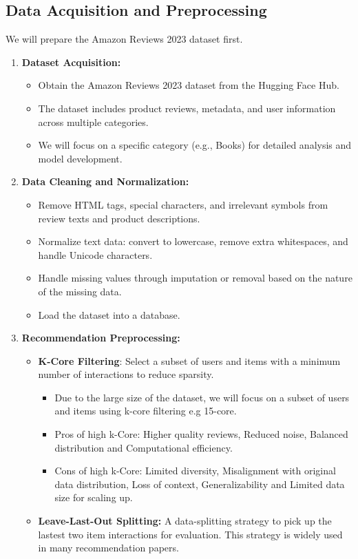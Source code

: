 \documentclass{article}
\begin{document}
\subsection{Data Acquisition and Preprocessing} 
We will prepare the Amazon Reviews 2023 dataset first.
\begin{enumerate}
    \item \textbf{Dataset Acquisition:} 
    \begin{itemize}
        \item Obtain the Amazon Reviews 2023 dataset from the Hugging Face Hub.
        \item The dataset includes product reviews, metadata, and user information across multiple categories.
        \item We will focus on a specific category (e.g., Books) for detailed analysis and model development.
    \end{itemize}
    
    \item \textbf{Data Cleaning and Normalization:}
    \begin{itemize}
        \item Remove HTML tags, special characters, and irrelevant symbols from review texts and product descriptions.
        \item Normalize text data: convert to lowercase, remove extra whitespaces, and handle Unicode characters.
        \item Handle missing values through imputation or removal based on the nature of the missing data.
        \item Load the dataset into a database.
  
    \end{itemize}
    
    \item \textbf{Recommendation Preprocessing:}
        \begin{itemize}
            \item \textbf{K-Core Filtering}: Select a subset of users and items with a minimum number of interactions to reduce sparsity. 
            \begin{itemize}
                \item Due to the large size of the dataset, we will focus on a subset of users and items using k-core filtering e.g 15-core.
                \item Pros of high k-Core: Higher quality reviews, Reduced noise, Balanced distribution and Computational efficiency.
                \item Cons of high k-Core: Limited diversity, Misalignment with original data distribution, Loss of context, Generalizability and Limited data size for scaling up.
            \end{itemize}
        \end{itemize}
        \begin{itemize}
        \item \textbf{Leave-Last-Out Splitting:} A data-splitting strategy to pick up the lastest two item interactions for evaluation. This strategy is widely used in many recommendation papers.
    

\end{itemize}
\end{enumerate}
\end{document}
